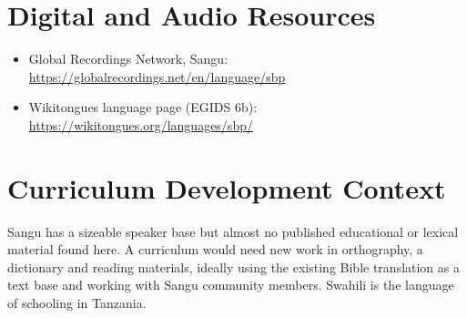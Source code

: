 \documentclass[12pt]{article}
\begin{document}
\section{Digital and Audio Resources}
\begin{itemize}
\item Global Recordings Network, Sangu: \url{https://globalrecordings.net/en/language/sbp}
\item Wikitongues language page (EGIDS 6b): \url{https://wikitongues.org/languages/sbp/}
\end{itemize}

\section{Curriculum Development Context}
Sangu has a sizeable speaker base but almost no published educational or lexical material found here. A curriculum would need new work in orthography, a dictionary and reading materials, ideally using the existing Bible translation as a text base and working with Sangu community members. Swahili is the language of schooling in Tanzania.
\end{document}
